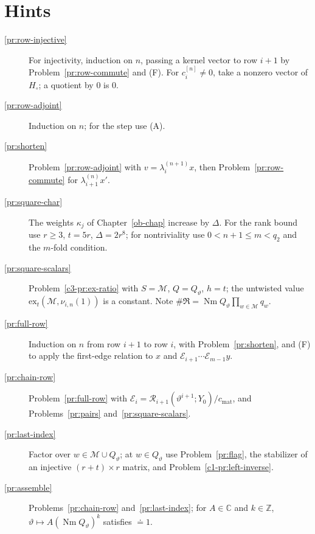 \documentclass[reqno]{amsart}
\newcounter{chap}
\theoremstyle{definition}
\theoremstyle{plain}
\newcommand{\Z}{\mathbb Z}
\newcommand{\C}{\mathbb C}
\newcommand{\Nm}{\operatorname{Nm}}
\newcommand{\Rc}{\mathcal R}
\newcommand{\cM}{\mathcal M}
\newcommand{\ex}{\mathrm{ex}}
\newcommand{\cmat}{c_{\mathrm{mat}}}
\newcommand{\Hc}{H_\circ}
\begin{document}
\section*{Hints}
\begin{description}
\item[\ref{pr:row-injective}] For injectivity, induction on \(n\), passing a kernel vector to row \(i+1\) by Problem~\ref{pr:row-commute} and (F).  For \(c_i^{[n]} \ne 0\), take a nonzero vector of \(\Hc\); a quotient by \(0\) is \(0\).
\item[\ref{pr:row-adjoint}] Induction on \(n\); for the step use (A).
\item[\ref{pr:shorten}] Problem~\ref{pr:row-adjoint} with \(v = \lambda_i^{(n+1)}x\), then Problem~\ref{pr:row-commute} for \(\lambda_{i+1}^{(n)}x'\).
\item[\ref{pr:square-char}] The weights \(\kappa_j\) of Chapter~\ref{ob-chap} increase by \(\Delta\).  For the rank bound use \(r \ge 3\), \(t = 5r\), \(\Delta = 2r^8\); for nontriviality use \(0 < n+1 \le m < q_2\) and the \(m\)-fold condition.
\item[\ref{pr:square-scalars}] Problem~\ref{c3-pr:ex-ratio} with \(S = \cM\), \(Q = Q_\vartheta\), \(h = t\); the untwisted value \(\ex_t(\cM, \nu_{i,n}(1))\) is a constant.  Note \(\#\mathfrak R = \Nm Q_\vartheta \prod_{w \in \cM} q_w\).
\item[\ref{pr:full-row}] Induction on \(n\) from row \(i+1\) to row \(i\), with Problem~\ref{pr:shorten}, and (F) to apply the first-edge relation to \(x\) and \(\mathcal E_{i+1}\cdots\mathcal E_{m-1}y\).
\item[\ref{pr:chain-row}] Problem~\ref{pr:full-row} with \(\mathcal E_i = \Rc_{i+1}(\vartheta^{i+1}; Y_0)/\cmat\), and Problems~\ref{pr:pairs} and~\ref{pr:square-scalars}.
\item[\ref{pr:last-index}] Factor over \(w \in \cM \cup Q_\vartheta\); at \(w \in Q_\vartheta\) use Problem~\ref{pr:flag}, the stabilizer of an injective \((r+t) \times r\) matrix, and Problem~\ref{c1-pr:left-inverse}.
\item[\ref{pr:assemble}] Problems~\ref{pr:chain-row} and~\ref{pr:last-index}; for \(A \in \C\) and \(k \in \Z\), \(\vartheta \mapsto A(\Nm Q_\vartheta)^k\) satisfies \(\doteq 1\).
\end{description}
\end{document}
